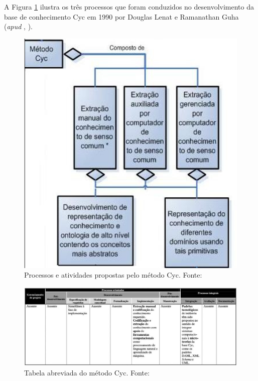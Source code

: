 A Figura \ref{fig:processos_cyc} ilustra os três processos que foram conduzidos no desenvolvimento da
base de conhecimento Cyc em 1990 por Douglas Lenat e Ramanathan Guha
(\textit{apud} \citeauthor{DanielaLucas2008}, \citeyear{DanielaLucas2008}).

\begin{figure}[h] 
\centering 
\includegraphics[scale=0.6]{Figuras/1.png} 
\caption[Processos e atividades propostas pelo método Cyc]
{Processos e atividades propostas pelo método Cyc. Fonte: \cite{DanielaLucas2008}}
\label{fig:processos_cyc}
\end{figure}

\begin{figure}[h] 
\centering 
\includegraphics[scale=0.3]{Figuras/2.png}
\caption[Tabela abreviada do método Cyc]{Tabela abreviada do método Cyc. Fonte: \cite{DanielaLucas2008}}
\end{figure}

